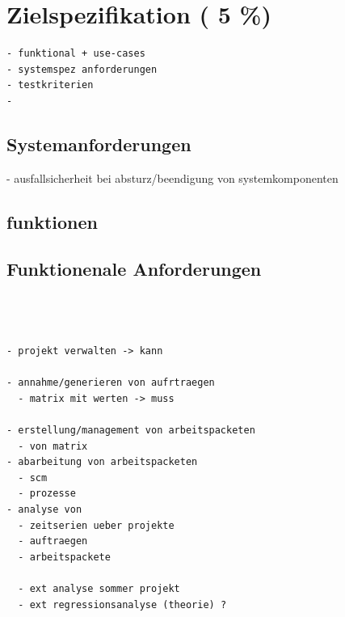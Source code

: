 \chapter{Zielspezifikation ( 5 \%)}












\begin{verbatim}
- funktional + use-cases
- systemspez anforderungen
- testkriterien
-
\end{verbatim}


\section{Systemanforderungen}

- ausfallsicherheit bei absturz/beendigung
  von systemkomponenten

\section{funktionen}
\section{Funktionenale Anforderungen}
\begin{verbatim}



- projekt verwalten -> kann

- annahme/generieren von aufrtraegen
  - matrix mit werten -> muss

- erstellung/management von arbeitspacketen
  - von matrix
- abarbeitung von arbeitspacketen
  - scm
  - prozesse
- analyse von
  - zeitserien ueber projekte
  - auftraegen
  - arbeitspackete

  - ext analyse sommer projekt
  - ext regressionsanalyse (theorie) ?
\end{verbatim}

